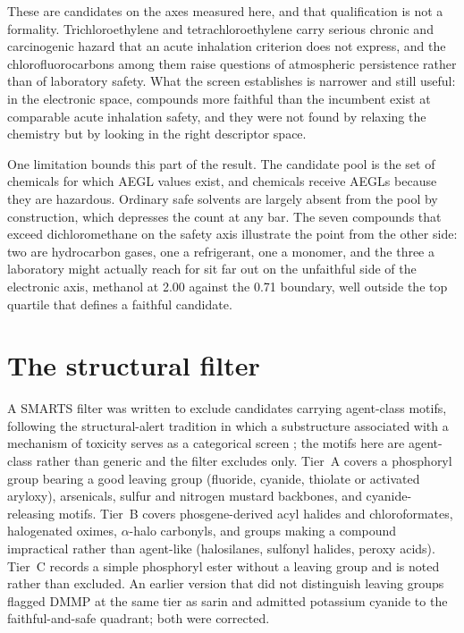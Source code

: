 \documentclass[11pt,a4paper]{article}
\begin{document}
\begin{sloppypar}
These are candidates on the axes measured here, and that qualification is not a
formality. Trichloroethylene and tetrachloroethylene carry serious chronic and
carcinogenic hazard that an acute inhalation criterion does not express, and the
chlorofluorocarbons among them raise questions of atmospheric persistence rather
than of laboratory safety. What the screen establishes is narrower and still
useful: in the electronic space, compounds more faithful than the incumbent
exist at comparable acute inhalation safety, and they were not found by relaxing
the chemistry but by looking in the right descriptor space.
\end{sloppypar}

One limitation bounds this part of the result. The candidate pool is the set of
chemicals for which AEGL values exist, and chemicals receive AEGLs because they
are hazardous. Ordinary safe solvents are largely absent from the pool by
construction, which depresses the count at any bar. The seven compounds that
exceed dichloromethane on the safety axis illustrate the point from the other
side: two are hydrocarbon gases, one a refrigerant, one a monomer, and the three
a laboratory might actually reach for sit far out on the unfaithful side of the
electronic axis, methanol at 2.00 against the 0.71 boundary, well outside the
top quartile that defines a faithful candidate.

\section{The structural filter}
\label{meth:filter}
\label{sec:alerts}
A SMARTS filter was written to exclude candidates carrying agent-class motifs,
following the structural-alert tradition in which a substructure associated with
a mechanism of toxicity serves as a categorical screen \cite{benigni2008,
enoch2011}; the motifs here are agent-class rather than generic and the filter
excludes only. Tier~A covers a phosphoryl group bearing a good leaving group
(fluoride, cyanide, thiolate or activated aryloxy), arsenicals, sulfur and
nitrogen mustard backbones, and cyanide-releasing motifs. Tier~B covers
phosgene-derived acyl halides and chloroformates, halogenated oximes,
$\alpha$-halo carbonyls, and groups making a compound impractical rather than
agent-like (halosilanes, sulfonyl halides, peroxy acids). Tier~C records a
simple phosphoryl ester without a leaving group and is noted rather than
excluded. An earlier version that did not
distinguish leaving groups flagged DMMP at the same tier as sarin and admitted
potassium cyanide to the faithful-and-safe quadrant; both were corrected.
\end{document}

